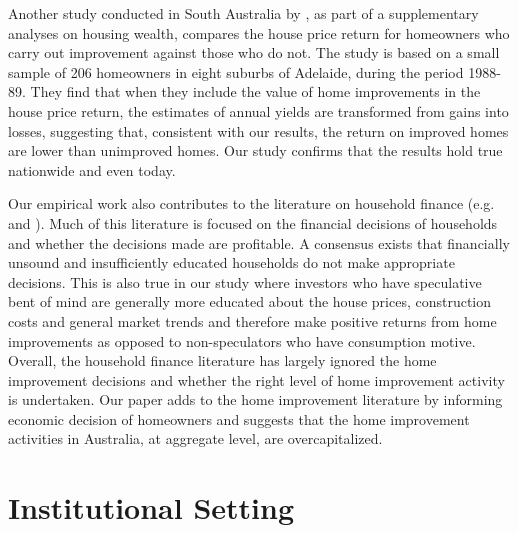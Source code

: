 \documentclass[AEJ,reqno, draftmode]{AEA} %
\begin{document}
Another study conducted in South Australia by \cite{badcock1994snakes}, as part of a supplementary analyses on housing wealth, compares the house price return for homeowners who carry out improvement against those who do not. The study is based on a small sample of 206 homeowners in eight suburbs of Adelaide, during the period 1988-89. They find that when they include the value of home improvements in the house price return, the estimates of annual yields are transformed from gains into losses, suggesting that, consistent with our results, the return on improved homes are lower than unimproved homes. Our study confirms that the results hold true nationwide and even today.







Our empirical work also contributes to the literature on household finance (e.g. \cite{barber2011behavior} and \cite{campbell2006household}). Much of this literature is focused on the financial decisions of households and whether the decisions made are profitable. A consensus exists that financially unsound and insufficiently educated households do not make appropriate decisions. This is also true in our study where investors who have speculative bent of mind are generally more educated about the house prices, construction costs and general market trends and therefore make positive returns from home improvements as opposed to non-speculators who have consumption motive. Overall, the household finance literature has largely ignored the home improvement decisions and whether the right level of home improvement activity is undertaken. Our paper adds to the home improvement literature by informing economic decision of homeowners and suggests that the home improvement activities in Australia, at aggregate level, are overcapitalized.


\section{Institutional Setting}
\end{document}
